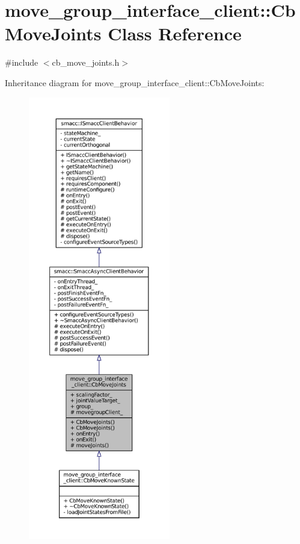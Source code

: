 \hypertarget{classmove__group__interface__client_1_1CbMoveJoints}{}\section{move\+\_\+group\+\_\+interface\+\_\+client\+:\+:Cb\+Move\+Joints Class Reference}
\label{classmove__group__interface__client_1_1CbMoveJoints}


{\ttfamily \#include $<$cb\+\_\+move\+\_\+joints.\+h$>$}



Inheritance diagram for move\+\_\+group\+\_\+interface\+\_\+client\+:\+:Cb\+Move\+Joints\+:
\nopagebreak
\begin{figure}[H]
\begin{center}
\leavevmode
\includegraphics[height=550pt]{classmove__group__interface__client_1_1CbMoveJoints__inherit__graph}
\end{center}
\end{figure}


